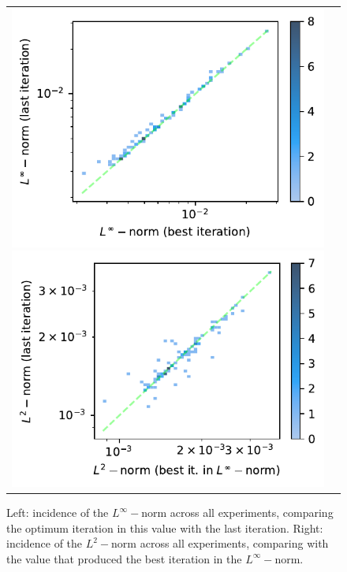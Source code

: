 \documentclass[12pt]{report} %
\begin{document}
\begin{figure}
  \hspace*{-2cm}
  \begin{tabular}{cc}
    \includegraphics[width=.6\textwidth]{imagenes/experiments/2d/pde_runge_2d/incidence_of_linf_runge_2d.pdf}
    \includegraphics[width=.6\textwidth]{imagenes/experiments/2d/pde_runge_2d/incidence_of_l2_runge_2d.pdf}
  \end{tabular}
  \caption{Left: incidence of the $L^\infty-$norm across all experiments, comparing the optimum iteration in this value with the last iteration. Right: incidence of the $L^2-$norm across all experiments, comparing with the value that produced the best iteration in the $L^\infty-$norm.}
  \label{fig:runge-pde-2d-results-incidence-l-norms}
\end{figure}
\end{document}
